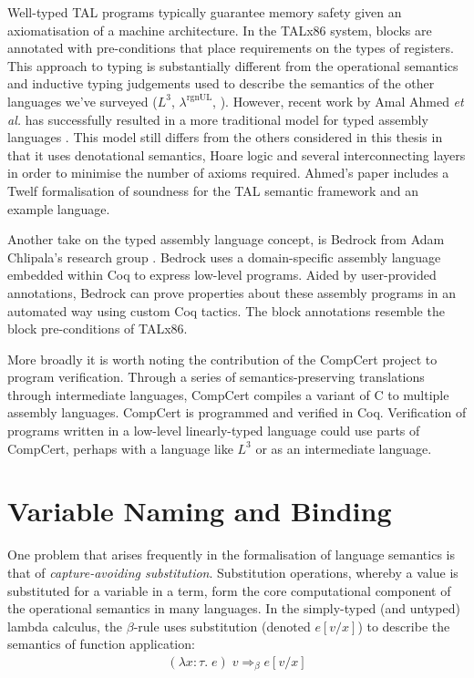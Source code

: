 \documentclass[]{unswthesis}
\newcommand{\rgnUL}{$\lambda^\text{rgnUL}$\text{ }}
\newcommand{\SSPHS}{\text{SSPHS }}
\let\i\textit
\begin{document}
Well-typed TAL programs typically guarantee memory safety given an axiomatisation of a machine architecture. In the TALx86 \cite{morrisett99, crary99} system, blocks are annotated with pre-conditions that place requirements on the types of registers. This approach to typing is substantially different from the operational semantics and inductive typing judgements used to describe the semantics of the other languages we've surveyed ($L^3$, \rgnUL, \SSPHS). However, recent work by Amal Ahmed \i{et al.}  has successfully resulted in a more traditional model for typed assembly languages \cite{ahmed10}. This model still differs from the others considered in this thesis in that it uses denotational semantics, Hoare logic and several interconnecting layers in order to minimise the number of axioms required. Ahmed's paper includes a Twelf formalisation of soundness for the TAL semantic framework and an example language.

Another take on the typed assembly language concept, is Bedrock from Adam Chlipala's research group \cite{chlipala11}. Bedrock uses a domain-specific assembly language embedded within Coq to express low-level programs. Aided by user-provided annotations, Bedrock can prove properties about these assembly programs in an automated way using custom Coq tactics. The block annotations resemble the block pre-conditions of TALx86.

More broadly it is worth noting the contribution of the CompCert \cite{leroy09} project to program verification. Through a series of semantics-preserving translations through intermediate languages, CompCert compiles a variant of C to multiple assembly languages. CompCert is programmed and verified in Coq. Verification of programs written in a low-level linearly-typed language could use parts of CompCert, perhaps with a language like $L^3$ or \SSPHS as an intermediate language.

\section{Variable Naming and Binding}
\label{sec:var-naming}

One problem that arises frequently in the formalisation of language semantics is that of \i{capture-avoiding substitution}. Substitution operations, whereby a value is substituted for a variable in a term, form the core computational component of the operational semantics in many languages. In the simply-typed (and untyped) lambda calculus, the $\beta$-rule uses substitution (denoted $e[v/x]$) to describe the semantics of function application:
\begin{eqnarray*}
(\lambda x : \tau. \; e) \; v \Longrightarrow_\beta e[v/x]
\end{eqnarray*}
\end{document}
